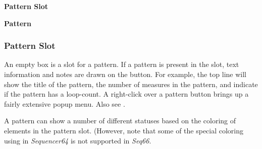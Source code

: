    \begin{enumber}
      \item \textbf{Pattern Slot}
      \item \textbf{Pattern}
   \end{enumber}

\subsubsection{Pattern Slot}
\label{subsubsec:patterns_pattern_slot}

   An empty box is a slot for a pattern.
   If a pattern is present in the slot, text information and notes are drawn on
   the button.
   For example, the top line will show
   the title of the pattern, the number of measures in the pattern, and
   indicate if the pattern has a loop-count.
   A right-click over a pattern button brings up a fairly extensive
   popup menu.
   Also see .

%

   A pattern can show a number of different statuses based on the coloring
   of elements in the pattern slot.
   (However, note that some of the special coloring using in
   \textsl{Sequencer64} is not supported in \textsl{Seq66}.

